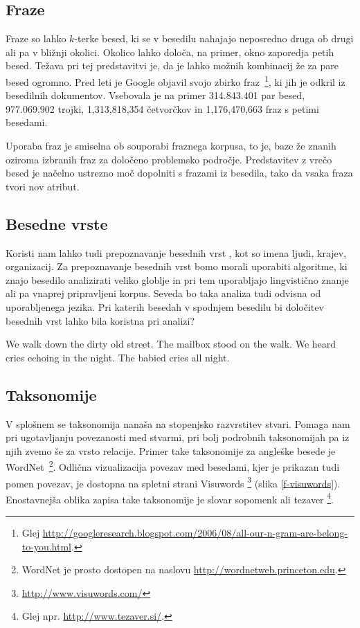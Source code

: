 \subsection{Fraze}

Fraze so lahko $k$-terke besed, ki se v besedilu nahajajo neposredno
druga ob drugi ali pa v bližnji okolici. Okolico lahko določa, na
primer, okno zaporedja petih besed. Težava pri tej predstavitvi je, da
je lahko možnih kombinacij že za pare besed ogromno. Pred leti je
Google objavil svojo zbirko fraz~\footnote{Glej
  \url{http://googleresearch.blogspot.com/2006/08/all-our-n-gram-are-belong-to-you.html}.},
ki jih je odkril iz besedilnih dokumentov. Vsebovala je na primer
314.843.401 par besed, 977.069.902 trojki, 1,313,818,354 četvorčkov in
1,176,470,663 fraz s petimi besedami.

Uporaba fraz je smiselna ob souporabi fraznega korpusa, to je, baze že
znanih oziroma izbranih fraz za določeno problemsko
področje. Predstavitev z vrečo besed je načelno ustrezno moč dopolniti
s frazami iz besedila, tako da vsaka fraza tvori nov atribut.

\subsection{Besedne vrste}

Koristi nam lahko tudi prepoznavanje besednih vrst
, kot so imena ljudi, krajev, organizacij. Za
prepoznavanje besednih vrst bomo morali uporabiti algoritme, ki znajo
besedilo analizirati veliko globlje in pri tem uporabljajo lingvistično
znanje ali pa vnaprej pripravljeni korpus. Seveda bo taka analiza tudi
odvisna od uporabljenega jezika. Pri katerih besedah v spodnjem
besedilu bi določitev besednih vrst lahko bila koristna pri analizi?

\begin{python}
We walk down the dirty old street.
The mailbox stood on the walk.
We heard cries echoing in the night.
The babied cries all night.
\end{python}

\subsection{Taksonomije}

V splošnem se taksonomija nanaša na stopenjsko razvrstitev
stvari. Pomaga nam pri ugotavljanju povezanosti med stvarmi, pri bolj
podrobnih taksonomijah pa iz njih zvemo še za
vrsto relacije. Primer take taksonomije za angleške besede je
WordNet~\footnote{WordNet je prosto dostopen na naslovu
  \url{http://wordnetweb.princeton.edu}.}. Odlična vizualizacija
povezav med besedami, kjer je prikazan tudi pomen povezav, je dostopna
na spletni strani Visuwords \footnote{\url{http://www.visuwords.com/}}
(slika \ref{f-visuwords}). Enostavnejša oblika zapisa take taksonomije je
slovar sopomenk ali tezaver \footnote{Glej
  npr. \url{http://www.tezaver.si/}.}.

